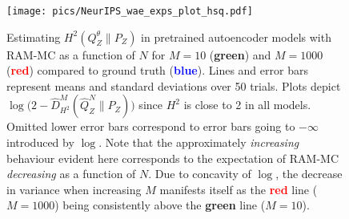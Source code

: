 \begin{figure}
\begin{center}
\texttt{[image: pics/NeurIPS\_wae\_exps\_plot\_hsq.pdf]}
\end{center}
\caption{\label{fig:real-exps-hsq}
Estimating $H^2(Q_Z^\theta \| P_Z)$ in pretrained autoencoder models with RAM-MC as a function of $N$ for $M=10$ ({\bf \textcolor{green!65!blue}{green}}) and $M{=}1000$ ({\bf \textcolor{red}{red}}) compared to ground truth ({\bf\textcolor{blue}{blue}}).
Lines and error bars represent means and standard deviations over 50 trials.
Plots depict $\log\big(2 - \hat{D}^M_{H^2}(\hat{Q}^N_Z \| P_Z)\big)$ since $H^2$ is close to 2 in all models.
Omitted lower error bars correspond to error bars going to $-\infty$ introduced by $\log$.
Note that the approximately \emph{increasing} behaviour evident here corresponds to the expectation of RAM-MC \emph{decreasing} as a function of $N$. 
Due to concavity of $\log$, the decrease in variance when increasing $M$ manifests itself as the {\bf \textcolor{red}{red}} line ($M{=}1000$) being consistently above the {\bf \textcolor{green!65!blue}{green}} line ($M{=}10$).
}
\end{figure}
